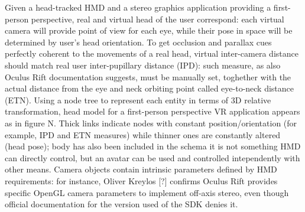 Given a head-tracked HMD and a stereo graphics application providing a first-person perspective, real and virtual head of the user correspond: each virtual camera will provide point of view for each eye, while their pose in space will be determined by user’s head orientation. To get occlusion and parallax cues perfectly coherent to the movements of a real head, virtual inter-camera distance should match real user inter-pupillary distance (IPD): such measure, as also Oculus Rift documentation suggests, must be manually set, toghether with the actual distance from the eye and neck orbiting point called eye-to-neck distance (ETN). Using a node tree to represent each entity in terms of 3D relative transformation, head model for a first-person perspective VR application appears as in figure N. Thick links indicate nodes with constant position/orientation (for example, IPD and ETN measures) while thinner ones are constantly altered (head pose); body has also been included in the schema it is not something HMD can directly control, but an avatar can be used and controlled intependently with other means. Camera objects contain intrinsic parameters defined by HMD requirements: for instance, Oliver Kreylos [?] confirms Oculus Rift provides specific OpenGL camera parameters to implement off-axis stereo, even though official documentation for the version used of the SDK denies it.

